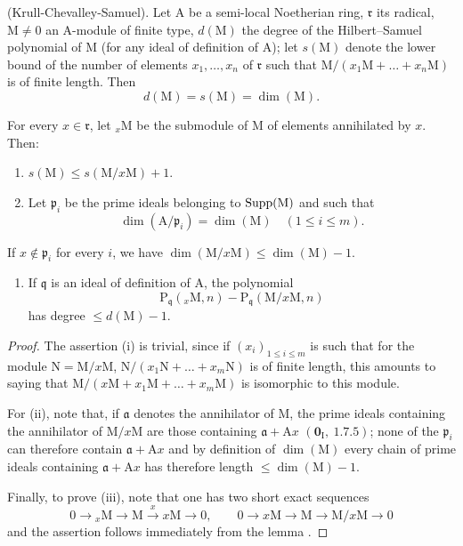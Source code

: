 \begin{theorem}[16.2.3]
\label{0.16.2.3}
\textup{(Krull-Chevalley-Samuel).}
Let $\mathrm{A}$ be a semi-local Noetherian ring, $\mathfrak{r}$ its radical, $\mathrm{M}\neq 0$ an $\mathrm{A}$-module of finite type, $d(\mathrm{M})$ the degree of the Hilbert--Samuel polynomial of $\mathrm{M}$ (for any ideal of definition of $\mathrm{A}$); let $s(\mathrm{M})$ denote the lower bound of the number of elements $x_1,\ldots,x_n$ of $\mathfrak{r}$ such that $\mathrm{M}/(x_1\mathrm{M}+\ldots+x_n\mathrm{M})$ is of finite length.
Then
\[
  d(\mathrm{M})=s(\mathrm{M})=\dim(\mathrm{M}).
\]
\end{theorem}

\begin{lemma}[16.2.3.1]
\label{0.16.2.3.1}
For every $x\in\mathfrak{r}$, let ${}_x\mathrm{M}$ be the submodule of $\mathrm{M}$ of elements annihilated by $x$.
Then:
\begin{enumerate}
  \item[\rm{(i)}] $s(\mathrm{M})\leq s(\mathrm{M}/x\mathrm{M})+1$.
  \item[\rm{(ii)}] Let $\mathfrak{p}_i$ be the prime ideals belonging to $\operatorname{Supp}(\mathrm{M})$ and such that
  \[
    \dim(\mathrm{A}/\mathfrak{p}_i)=\dim(\mathrm{M})\quad(1\leq i\leq m).
  \]
\end{enumerate}
If $x\notin\mathfrak{p}_i$ for every $i$, we have $\dim(\mathrm{M}/x\mathrm{M})\leq\dim(\mathrm{M})-1$.
\begin{enumerate}
  \item[\rm{(iii)}] If $\mathfrak{q}$ is an ideal of definition of $\mathrm{A}$, the polynomial
  \[
    \mathrm{P}_\mathfrak{q}({}_x\mathrm{M},n)-\mathrm{P}_\mathfrak{q}(\mathrm{M}/x\mathrm{M},n)
  \]
  has degree $\leq d(\mathrm{M})-1$.
\end{enumerate}
\end{lemma}

\begin{proof}
The assertion (i) is trivial, since if $(x_i)_{1\leq i\leq m}$ is such that for the module $\mathrm{N}=\mathrm{M}/x\mathrm{M}$, $\mathrm{N}/(x_1\mathrm{N}+\ldots+x_m\mathrm{N})$ is of finite length, this amounts to saying that $\mathrm{M}/(x\mathrm{M}+x_1\mathrm{M}+\ldots+x_m\mathrm{M})$ is isomorphic to this module.

For (ii), note that, if $\mathfrak{a}$ denotes the annihilator of $\mathrm{M}$, the prime ideals containing the annihilator of $\mathrm{M}/x\mathrm{M}$ are those containing $\mathfrak{a}+\mathrm{A}x$ $(\mathbf{0}_\mathrm{I},~1.7.5)$; none of the $\mathfrak{p}_i$ can therefore contain $\mathfrak{a}+\mathrm{A}x$ and by definition of $\dim(\mathrm{M})$  every chain of prime ideals containing $\mathfrak{a}+\mathrm{A}x$ has therefore length $\leq\dim(\mathrm{M})-1$.


Finally, to prove (iii), note that one has two short exact sequences
\[
  0\to{}_x\mathrm{M}\to\mathrm{M}\xrightarrow{x}x\mathrm{M}\to 0,\qquad 0\to x\mathrm{M}\to\mathrm{M}\to\mathrm{M}/x\mathrm{M}\to 0
\]
and the assertion follows immediately from the lemma .
\end{proof}

